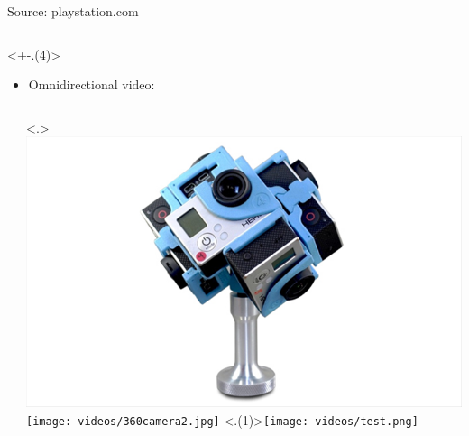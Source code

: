 \begin{frame}[c]
\begin{columns}[T]
\begin{column}{0.35\linewidth}
            \vspace{-0.25cm}
            {\tiny Source: playstation.com}
        \end{column}
      \end{columns}

   \vfill
   \begin{minipage}[t][7cm][t]{\textwidth}
      \only<+-.(4)>{
         \begin{itemize}[<.->]
            \item Omnidirectional video:
         \end{itemize}
         \begin{columns}[T]
            \begin{column}{0.5\linewidth}
               \begin{independentCounter}
                  
               \end{independentCounter}
            \end{column}
            \begin{column}{0.5\linewidth}
               \only<.>{
                  \includegraphics[scale=0.15]{videos/360camera1.png}
                  \texttt{[image: videos/360camera2.jpg]}
                  \setcounter{tmpCounter}{\value{beamerpauses}}
               }
               \only<.(1)>{\hspace{2cm}\texttt{[image: videos/test.png]}}

\end{column}
\end{columns}}
\end{minipage}
\end{frame}
